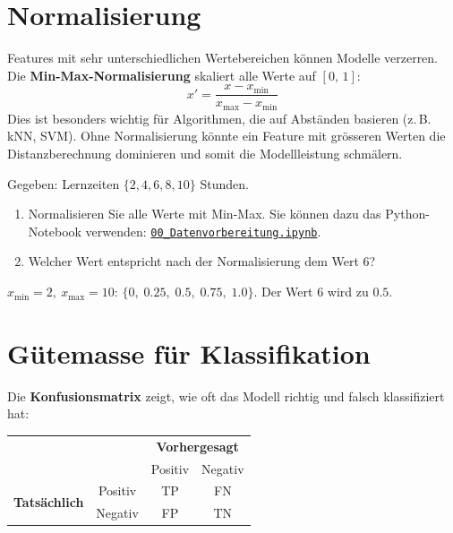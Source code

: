 \section{Normalisierung}

\begin{mydefinition}
Features mit sehr unterschiedlichen Wertebereichen können Modelle verzerren.
Die \textbf{Min-Max-Normalisierung} skaliert alle Werte auf $[0,\,1]$:
\[
x' = \frac{x - x_{\min}}{x_{\max} - x_{\min}}
\]
Dies ist besonders wichtig für Algorithmen, die auf Abständen basieren (z.\,B. kNN, SVM). Ohne Normalisierung könnte ein Feature mit grösseren Werten die Distanzberechnung dominieren und somit die Modellleistung schmälern.
\end{mydefinition}

\begin{myexercise}
Gegeben: Lernzeiten $\{2, 4, 6, 8, 10\}$ Stunden.
\begin{enumerate}
    \item Normalisieren Sie alle Werte mit Min-Max. Sie können dazu das Python-Notebook verwenden: \href{\notebookbaseurl00_Datenvorbereitung.ipynb}{\texttt{00\_Datenvorbereitung.ipynb}}.
    \item Welcher Wert entspricht nach der Normalisierung dem Wert 6?
\end{enumerate}
\begin{myanswer}
$x_{\min}=2,\ x_{\max}=10$: 
$\{0,\; 0.25,\; 0.5,\; 0.75,\; 1.0\}$. 
Der Wert 6 wird zu $0.5$.
\end{myanswer}
\end{myexercise}

\section{Gütemasse für Klassifikation}

\begin{mydefinition}[Konfusionsmatrix]
Die \textbf{Konfusionsmatrix} zeigt, wie oft das Modell richtig und falsch klassifiziert hat:

\begin{center}
\begin{tabular}{cc|cc}
 & & \multicolumn{2}{c}{\textbf{Vorhergesagt}} \\
 & & Positiv & Negativ \\
\hline
\multirow{2}{*}{\textbf{Tatsächlich}} & Positiv & TP & FN \\
 & Negativ & FP & TN \\
\end{tabular}
\end{center}
\end{mydefinition}

